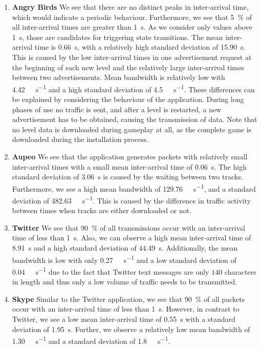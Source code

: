 \begin{enumerate}
\item \textbf{Angry Birds}
We see that there are no distinct peaks in inter-arrival time, which would indicate a periodic behaviour.
Furthermore, we see that \SI{5}{\percent} of all inter-arrival times are greater than \SI{1}{\second}.
As we consider only \TDCH values above \SI{1}{\second}, those are candidates for triggering state transitions.
The mean inter-arrival time is \SI{0.66}{\second}, with a relatively high standard deviation of \SI{15.90}{\second}.
This is caused by the low inter-arrival times in one advertisement request at the beginning of each new level and the relatively large inter-arrival times between two advertisements.
Mean bandwidth is relatively low with \SI{4.42}{\kilo\bit\per\second} and a high standard deviation of \SI{4.5}{\kilo\bit\per\second}.
These differences can be explained by considering the behaviour of the application.
During long phases of use no traffic is sent, and after a level is restarted, a new advertisement has to be obtained, causing the transmission of data.
Note that no level data is downloaded during gameplay at all, as the complete game is downloaded during the installation process.

\item \textbf{Aupeo} We see that the application generates packets with relatively small inter-arrival times with a small mean inter-arrival time of \SI{0.06}{\second}.
The high standard deviation of \SI{3.06}{\second} is caused by the waiting between two tracks.
Furthermore, we see a high mean bandwidth of \SI{129.76}{\kilo\bit\per\second}, and a standard deviation of \SI{482.63}{\kilo\bit\per\second}.
This is caused by the difference in traffic activity between times when tracks are either downloaded or not.

\item \textbf{Twitter} We see that \SI{90}{\percent} of all transmissions occur with an inter-arrival time of less than \SI{1}{\second}.
Also, we can observe a high mean inter-arrival time of \SI{8.91}{\second} and a high standard deviation of \SI{44.49}{\second}.
Additionally, the mean bandwidth is low with only \SI{0.27}{\kilo\bit\per\second} and a low standard deviation of \SI{0.04}{\kilo\bit\per\second} due to the fact that Twitter text messages are only \(140\) characters in length and thus only a low volume of traffic needs to be transmitted.

\item \textbf{Skype} Similar to the Twitter application, we see that \SI{90}{\%} of all packets occur with an inter-arrival time of less than \SI{1}{\second}.
However, in contrast to Twitter, we see a low mean inter-arrival time of \SI{0.55}{\second} with a standard deviation of \SI{1.95}{\second}.
Further, we observe a relatively low mean bandwidth of \SI{1.30}{\kilo\bit\per\second} and a standard deviation of \SI{1.8}{\kilo\bit\per\second}.
\end{enumerate}

